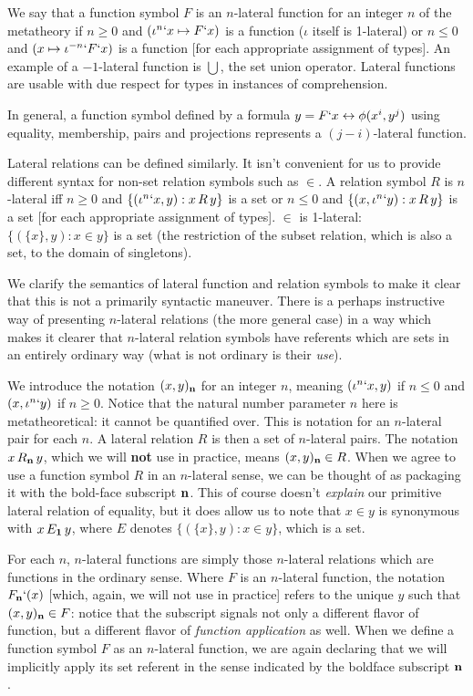 \documentclass[12pt]{article}
\begin{document}
We say that a function symbol $F$ is an $n$-lateral function for an integer $n$ of the metatheory  if $n\geq 0$ and $(\iota^n`x \mapsto F`x)$ is a function ($\iota$ itself is 1-lateral)
or $n\leq 0$ and $(x \mapsto \iota^{-n}`F`x)$ is a function [for each appropriate assignment of types]. An example of a $-1$-lateral function is $\bigcup$, the set union operator.   Lateral functions are usable with due respect for types in instances of comprehension.

In general, a function symbol defined by a formula $y = F`x \leftrightarrow \phi(x^i,y^j)$ using equality, membership, pairs and projections represents a $(j-i)$-lateral function.

Lateral relations can be defined similarly.  It isn't convenient for us to provide different syntax for non-set relation symbols such as $\in$.  A relation symbol
$R$ is $n$-lateral iff $n \geq 0$ and $\{(\iota^n`x,y):x \, R\, y\}$ is a set or $n \leq 0$ and $\{(x,\iota^n`y):x \, R\, y\}$ is a set [for each appropriate assignment of types].  $\in$ is 1-lateral:  $\{(\{x\},y):x \in y\}$ is a set (the restriction of the subset relation, which is also a set, to the domain of singletons).

We clarify the semantics of lateral function and relation symbols to make it clear that this is not a primarily syntactic maneuver.  There is a perhaps instructive way of presenting $n$-lateral relations (the more general case) in a way which makes it clearer that $n$-lateral relation symbols have referents which are sets in an entirely ordinary way (what is not ordinary is their {\em use\/}).

We introduce the notation $(x,y)_{\bf n}$ for an integer $n$, meaning $(\iota^n`x,y)$ if $n\leq0$ and $(x,\iota^n`y)$ if $n\geq 0$.  Notice that the natural number parameter $n$ here is metatheoretical:  it cannot be quantified over.  This is notation for an $n$-lateral pair for each $n$.  A lateral relation $R$ is then a set of $n$-lateral pairs.  The notation $x \, R_{\bf n} \, y$, which we will {\bf not} use in practice, means $(x,y)_{\bf n} \in R$.  When we agree to use a function symbol $R$ in an $n$-lateral sense, we can be thought of as packaging it with the bold-face subscript ${\bf n}$.  This of course doesn't {\em explain\/} our primitive lateral relation of equality, but it does allow us to note that $x \in y$ is synonymous with $x \, E_{\bf 1} \, y$, where
$E$ denotes $\{(\{x\},y):x \in y\}$, which is a set.  

For each $n$, $n$-lateral functions are simply those $n$-lateral relations which are functions in the ordinary sense.  Where $F$ is an $n$-lateral function, the notation
$F_{\bf n}`(x)$ [which, again, we will not use in practice] refers to the unique $y$ such that $(x,y)_{\bf n}\in F$:  notice that the subscript  signals not only  a different flavor of function, but a different flavor of {\em function application\/} as well.   When we define a function symbol $F$ as an $n$-lateral function, we are again declaring that we will implicitly apply its set referent  in the sense
indicated by the boldface subscript ${\bf n}$.
\end{document}
